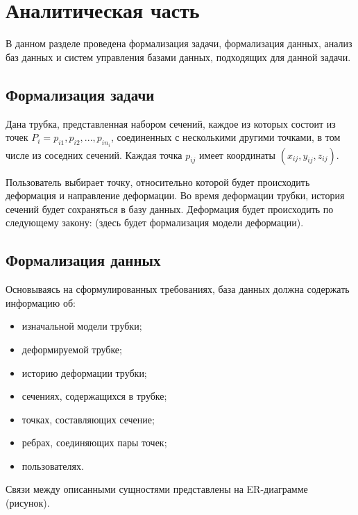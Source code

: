 \section{Аналитическая часть}

\noindent
\hspace{0.75cm}
В данном разделе проведена формализация задачи, формализация данных, анализ баз данных и систем управления базами данных, подходящих для данной задачи.

\subsection{Формализация задачи}

\noindent
\hspace{0.75cm}
Дана трубка, представленная набором сечений, каждое из которых состоит из точек $P_i = {p_{i1}, p_{i2}, ..., p_{in_i}}$, соединенных с несколькими другими точками, в том числе из соседних сечений. Каждая точка $p_{ij}$ имеет координаты $(x_{ij}, y_{ij}, z_{ij})$.

\noindent
\hspace{0.75cm}
Пользователь выбирает точку, относительно которой будет происходить деформация и направление деформации. Во время деформации трубки, история сечений будет сохраняться в базу данных. Деформация будет происходить по следующему закону: (здесь будет формализация модели деформации).

\subsection{Формализация данных}

\noindent
\hspace{0.75cm}
Основываясь на сформулированных требованиях, база данных должна содержать информацию об:

\begin{itemize}
	\item изначальной модели трубки;
	\item деформируемой трубке;
	\item историю деформации трубки;
	\item сечениях, содержащихся в трубке;
	\item точках, составляющих сечение;
	\item ребрах, соединяющих пары точек;
	\item пользователях.
\end{itemize}

\noindent
\hspace{0.75cm}
Связи между описанными сущностями представлены на ER-диаграмме (рисунок).